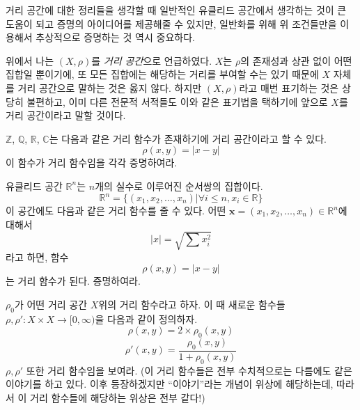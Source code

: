 거리 공간에 대한 정리들을 생각할 때 일반적인 유클리드 공간에서 생각하는 것이 큰 도움이 되고 증명의 아이디어를 제공해줄 수 있지만,
일반화를 위해 위 조건들만을 이용해서 추상적으로 증명하는 것 역시 중요하다.

\begin{remark}\label{rem:set_as_space}
위에서 나는 $(X, \rho)$를 \textit{거리 공간}으로 언급하였다. 
$X$는 $\rho$의 존재성과 상관 없이 어떤 집합일 뿐이기에, 또 모든 집합에는 해당하는 거리를 부여할 수는 있기 때문에 $X$ 자체를 거리 공간으로 말하는 것은 옳지 않다.
하지만 $(X, \rho)$라고 매번 표기하는 것은 상당히 불편하고, 이미 다른 전문적 서적들도 이와 같은 표기법을 택하기에 앞으로 $X$를 거리 공간이라고 말할 것이다.
\end{remark}

\begin{example}
$\mathbb{Z}$, $\mathbb{Q}$, $\mathbb{R}$, $\mathbb{C}$는 다음과 같은 거리 함수가 존재하기에 거리 공간이라고 할 수 있다.
\begin{equation}
    \rho(x, y) = |x - y|
\end{equation}
이 함수가 거리 함수임을 각각 증명하여라.
\end{example}

\begin{example}
    유클리드 공간 $\mathbb{R}^n$는 $n$개의 실수로 이루어진 순서쌍의 집합이다.
    \begin{equation}
        \mathbb{R}^n = \{ (x_1, x_2, \dots, x_n) | \forall i \leq n, x_i \in \mathbb{R} \}
    \end{equation}
    이 공간에도 다음과 같은 거리 함수를 줄 수 있다.
    어떤 $\mathbf{x} = (x_1, x_2, \dots, x_n) \in \mathbb{R}^n$에 대해서 
    \begin{equation}
        | x | = \sqrt{\sum{x_i^2}}
    \end{equation}라고 하면, 함수
\begin{equation}
    \rho(x, y) = |x - y|
\end{equation}
는 거리 함수가 된다. 증명하여라. 
\end{example}

\begin{exercise}
$\rho_0$가 어떤 거리 공간 $X$위의 거리 함수라고 하자.
이 때 새로운 함수들 $\rho, \rho': X \times X \to [0, \infty)$을 다음과 같이 정의하자.
\begin{equation}
    \rho(x, y) = 2 \times \rho_0(x, y)
\end{equation}
\begin{equation}
    \rho'(x, y) = \frac{\rho_0(x,y)}{1+ \rho_0(x,y)}
\end{equation}
$\rho, \rho'$ 또한 거리 함수임을 보여라.
(이 거리 함수들은 전부 수치적으로는 다름에도 같은 이야기를 하고 있다.
이후 등장하겠지만 ``이야기''라는 개념이 위상에 해당하는데, 따라서 이 거리 함수들에 해당하는 위상은 전부 같다!)
\end{exercise}

